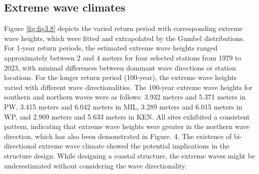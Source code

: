 \subsection{Extreme wave climates}
\label{c3_Extreme wave climates}

Figure \ref{fig:fig3.8} depicts the varied return period with corresponding
extreme wave heights, which were fitted and extrapolated by the Gumbel
distributions. For 1-year return periods, the estimated extreme wave heights
ranged approximately between 2 and 4 meters for four selected stations from 1979
to 2023, with minimal differences between dominant wave directions or station
locations. For the longer return period (100-year), the extreme wave heights
varied with different wave directionalities. The 100-year extreme wave heights
for southern and northern waves were as follows: 3.932 meters and 5.371 meters
in PW, 3.415 meters and 6.042 meters in MIL, 3.289 meters and 6.015 meters in
WP, and 2.909 meters and 5.633 meters in KEN. All sites exhibited a consistent
pattern, indicating that extreme wave heights were greater in the northern wave
direction, which has also been demonstrated in Figure. 4. The existence of
bi-directional extreme wave climate showed the potential implications in the
structure design. While designing a coastal structure, the extreme waves might
be underestimated without considering the wave directionality.

